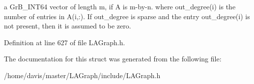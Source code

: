 a Gr\+B\+\_\+\+I\+N\+T64 vector of length m, if A is m-\/by-\/n. where out\+\_\+degree(i) is the number of entries in A(i,\+:). If out\+\_\+degree is sparse and the entry out\+\_\+degree(i) is not present, then it is assumed to be zero. 

Definition at line 627 of file L\+A\+Graph.\+h.



The documentation for this struct was generated from the following file\+:\begin{DoxyCompactItemize}
\item 
/home/davis/master/\+L\+A\+Graph/include/L\+A\+Graph.\+h\end{DoxyCompactItemize}
